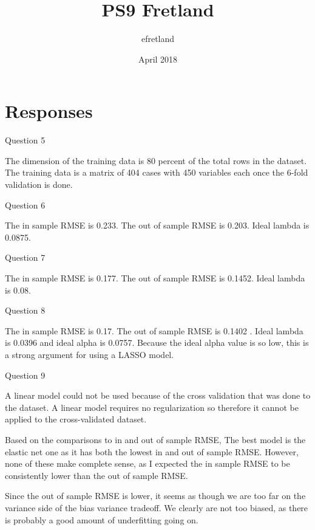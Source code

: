\documentclass{article}
\title{PS9 Fretland}
\author{efretland }
\date{April 2018}
\begin{document}
\maketitle

\section{Responses}

Question 5

The dimension of the training data is 80 percent of the total rows in the dataset. The training data is a matrix of 404 cases with 450 variables each once the 6-fold validation is done. 

Question 6

The in sample RMSE is 0.233. The out of sample RMSE is 0.203. Ideal lambda is 0.0875. 

Question 7

The in sample RMSE is 0.177. The out of sample RMSE is 0.1452. Ideal lambda is 0.08.

Question 8

The in sample RMSE is 0.17. The out of sample RMSE is 0.1402 . Ideal lambda is 0.0396 and ideal alpha is 0.0757. Because the ideal alpha value is so low, this is a strong argument for using a LASSO model. 

Question 9

A linear model could not be used because of the cross validation that was done to the dataset. A linear model requires no regularization so therefore it cannot be applied to the cross-validated dataset. 

Based on the comparisons to in and out of sample RMSE, The best model is the elastic net one as it has both the lowest in and out of sample RMSE. However, none of these make complete sense, as I expected the in sample RMSE to be consistently lower than the out of sample RMSE. 

Since the out of sample RMSE is lower, it seems as though we are too far on the variance side of the bias variance tradeoff. We clearly are not too biased, as there is probably a good amount of underfitting going on. 
\end{document}
